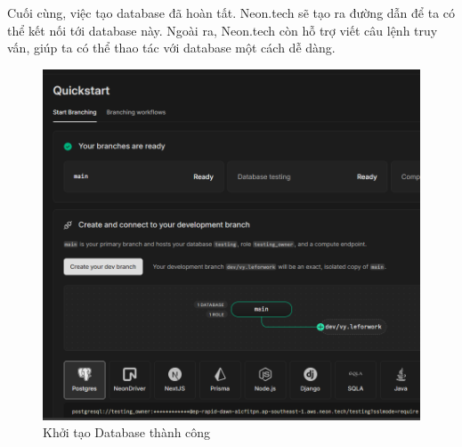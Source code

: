 Cuối cùng, việc tạo database đã hoàn tất. Neon.tech sẽ tạo ra đường dẫn để ta có thể kết nối tới database này. Ngoài ra,
Neon.tech còn hỗ trợ viết câu lệnh truy vấn, giúp ta có thể thao tác với database một cách dễ dàng.
\begin{figure}[H]
    \centering
    \includegraphics[width=\linewidth]{Content/Hiện thực hệ thống/images/finishDBcreate.png}
    \caption{Khởi tạo Database thành công}
    \label{fig:Khởi tạo Database thành công}
\end{figure}